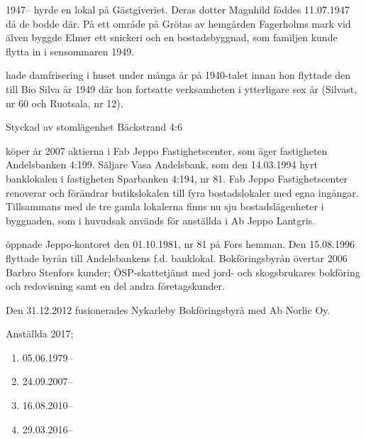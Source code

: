 1947-- hyrde  en lokal på Gästgiveriet. Deras dotter Magnhild föddes 11.07.1947 då de bodde där.	På ett område på Grötas av hemgården Fagerholms mark vid älven byggde Elmer ett snickeri och en bostadsbyggnad, som familjen kunde flytta in i sensommaren 1949.

 hade damfrisering i huset under många år på 1940-talet innan hon flyttade den till Bio Silva år 1949 där hon fortsatte verksamheten i ytterligare sex år (Silvast, nr 60 och Ruotsala, nr 12).



%

Styckad av stomlägenhet Bäckstrand 4:6

%
 köper år 2007 aktierna i Fab Jeppo Fastighetscenter, som äger fastigheten Andelsbanken 4:199.	Säljare Vasa Andelsbank, som den 14.03.1994 hyrt banklokalen i fastigheten Sparbanken 4:194, nr 81. Fab Jeppo Fastighetscenter renoverar och förändrar butikslokalen till fyra bostadslokaler med egna ingångar. Tillsammans med de tre gamla lokalerna finns nu sju bostadslägenheter i byggnaden, som i huvudsak används för anställda i Ab Jeppo Lantgris.



 öppnade Jeppo-kontoret den 01.10.1981, nr 81 på Fors hemman. Den 15.08.1996 flyttade byrån till Andelsbankens f.d. banklokal. Bokföringsbyrån övertar 2006 Barbro Stenfors kunder; ÖSP-skattetjänst med jord- och skogsbrukares bokföring och redovisning samt en del andra företagskunder.

Den 31.12.2012 fusionerades Nykarleby Bokföringsbyrå med Ab Norlic Oy.

Anställda 2017;
\begin{enumerate}
  \item {}        05.06.1979--
  \item {}      	 24.09.2007--
  \item {}   	 16.08.2010--
  \item {}  	 29.03.2016--
\end{enumerate}

